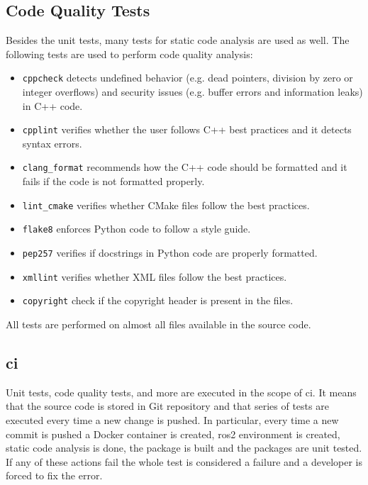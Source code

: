 \subsection{Code Quality Tests}
Besides the unit tests, many tests for static code analysis are used as well. The following tests are used to perform code quality analysis:
\begin{itemize}
    \item \texttt{cppcheck} detects undefined behavior (e.g. dead pointers, division by zero or integer overflows) and security issues (e.g. buffer errors and information leaks) in C++ code.
    \item \texttt{cpplint} verifies whether the user follows C++ best practices and it detects syntax errors.
    \item \texttt{clang\_format} recommends how the C++ code should be formatted and it fails if the code is not formatted properly. 
    \item \texttt{lint\_cmake} verifies whether CMake files follow the best practices.
    \item \texttt{flake8} enforces Python code to follow a style guide.
    \item \texttt{pep257} verifies if docstrings in Python code are properly formatted.
    \item \texttt{xmllint} verifies whether XML files follow the best practices.
    \item \texttt{copyright} check if the copyright header is present in the files.
\end{itemize}

All tests are performed on almost all files available in the source code. 

\subsection{\acl{ci}}
Unit tests, code quality tests, and more are executed in the scope of \ac{ci}. It means that the source code is stored in Git repository and that series of tests are executed every time a new change is pushed. In particular, every time a new commit is pushed a Docker container is created, \ac{ros2} environment is created, static code analysis is done, the package is built and the packages are unit tested. If any of these actions fail the whole test is considered a failure and a developer is forced to fix the error.
